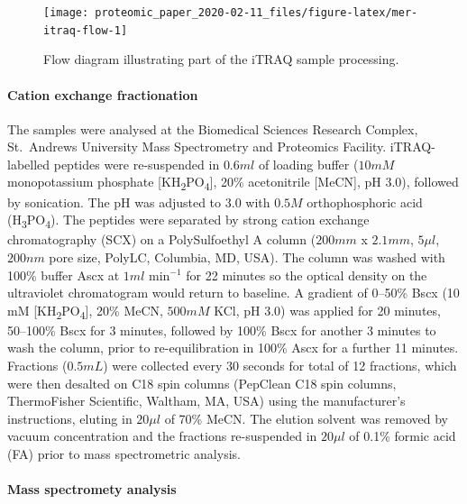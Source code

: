 \documentclass[
]{article}
\begin{document}
\begin{figure}
\texttt{[image: proteomic\_paper\_2020-02-11\_files/figure-latex/mer-itraq-flow-1]} \caption{Flow diagram illustrating part of the iTRAQ sample processing.}\label{fig:mer-itraq-flow}
\end{figure}

\hypertarget{cation-exchange-fractionation}{%
\paragraph{Cation exchange fractionation}\label{cation-exchange-fractionation}}

The samples were analysed at the Biomedical Sciences Research Complex, St.~Andrews University Mass Spectrometry and Proteomics Facility.
iTRAQ-labelled peptides were re-suspended in \(0.6 ml\) of loading buffer (\(10 mM\) monopotassium phosphate {[}KH\textsubscript{2}PO\textsubscript{4}{]}, 20\% acetonitrile {[}MeCN{]}, pH 3.0), followed by sonication.
The pH was adjusted to \(3.0\) with \(0.5 M\) orthophosphoric acid (H\textsubscript{3}PO\textsubscript{4}).
The peptides were separated by strong cation exchange chromatography (SCX) on a PolySulfoethyl A column (\(200 mm\) x \(2.1 mm\), \(5\mu l\), \(200 nm\) pore size, PolyLC, Columbia, MD, USA).
The column was washed with 100\% buffer Ascx at \(1 ml\) min\(^{-1}\) for 22 minutes so the optical density on the ultraviolet chromatogram would return to baseline.
A gradient of 0--50\% Bscx (10 mM {[}KH\textsubscript{2}PO\textsubscript{4}{]}, 20\% MeCN, \(500 mM\) KCl, pH 3.0) was applied for 20 minutes, 50--100\% Bscx for 3 minutes, followed by 100\% Bscx for another 3 minutes to wash the column, prior to re-equilibration in 100\% Ascx for a further 11 minutes.
Fractions (\(0.5 mL\)) were collected every 30 seconds for total of 12 fractions, which were then desalted on C18 spin columns (PepClean C18 spin columns, ThermoFisher Scientific, Waltham, MA, USA) using the manufacturer's instructions, eluting in \(20\mu l\) of 70\% MeCN.
The elution solvent was removed by vacuum concentration and the fractions re-suspended in \(20 \mu l\) of 0.1\% formic acid (FA) prior to mass spectrometric analysis.

\hypertarget{mass-spectromety-analysis}{%
\paragraph{Mass spectromety analysis}\label{mass-spectromety-analysis}}
\end{document}
